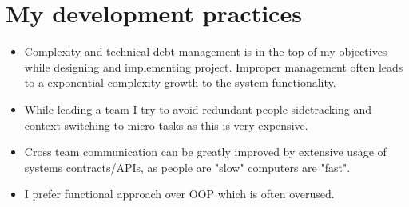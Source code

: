 \documentclass[letterpaper,11pt]{article}
\begin{document}
\section{My development practices}


\begin{itemize}
\item Complexity and technical debt management is in the top of my objectives while designing and implementing project. Improper management often leads to a exponential complexity growth to the system functionality.
\item While leading a team I try to avoid redundant people sidetracking and context switching to micro tasks as this is very expensive.
\item Cross team communication can be greatly improved by extensive usage of systems contracts/APIs, as people are "slow" computers are "fast".
\item I prefer functional approach over OOP which is often overused.
\end{itemize}

\end{document}
